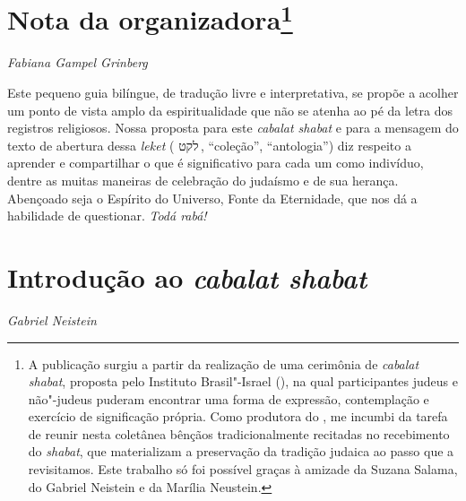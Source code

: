 

\chapter*{Nota da organizadora\footnote{ 
	A publicação surgiu a partir da realização de uma cerimônia de 
	\emph{cabalat shabat}, proposta pelo Instituto Brasil"-Israel (), na qual participantes judeus e não"-judeus puderam encontrar uma forma de expressão, contemplação e exercício de significação própria. Como produtora do , me incumbi da tarefa de reunir nesta coletânea bênçãos tradicionalmente recitadas no recebimento do \emph{shabat}, que materializam a preservação da tradição judaica ao passo que a revisitamos.
	Este trabalho só foi possível graças à amizade da Suzana Salama, do Gabriel Neistein e da Marília Neustein.} }


\begin{flushright}
\emph{Fabiana Gampel Grinberg}
\end{flushright}


Este pequeno guia bilíngue, de tradução livre e interpretativa,
 se propõe a acolher um ponto de vista amplo da espiritualidade que não se atenha ao pé da letra dos registros religiosos. Nossa proposta para este \emph{cabalat shabat} e  para a mensagem do texto de abertura dessa \emph{leket} ( {לקט}\,, ``coleção'', ``antologia'') diz respeito a aprender e compartilhar o que é significativo para cada um como indivíduo, dentre as muitas maneiras de celebração do judaísmo e de sua herança. {Abençoado seja o Espírito do Universo, Fonte da Eternidade, que nos dá a habilidade de questionar}.
\emph{Todá rabá!}


\chapter*{Introdução ao \emph{cabalat shabat}}


\begin{flushright}
\emph{Gabriel Neistein}
\end{flushright}



